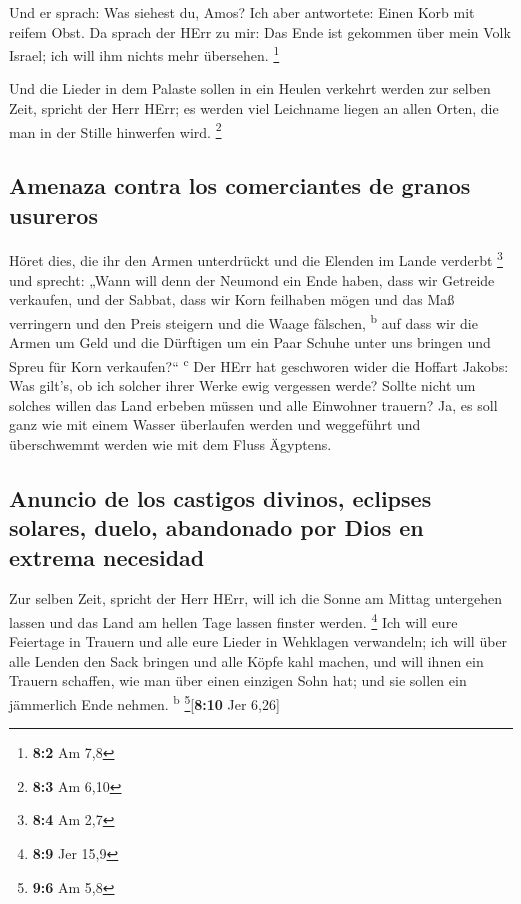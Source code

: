  Und er sprach: Was siehest du, Amos? Ich aber antwortete:
Einen Korb mit reifem Obst. Da sprach der HErr zu mir: Das Ende ist
gekommen über mein Volk Israel; ich will ihm nichts mehr übersehen.
\footnote{\textbf{8:2} Am 7,8}

 Und die Lieder in dem Palaste sollen in ein Heulen
verkehrt werden zur selben Zeit, spricht der Herr HErr; es werden viel
Leichname liegen an allen Orten, die man in der Stille hinwerfen wird.
\footnote{\textbf{8:3} Am 6,10}

\hypertarget{amenaza-contra-los-comerciantes-de-granos-usureros}{%
\subsection{Amenaza contra los comerciantes de granos
usureros}\label{amenaza-contra-los-comerciantes-de-granos-usureros}}

 Höret dies, die ihr den Armen unterdrückt und die Elenden
im Lande verderbt \footnote{\textbf{8:4} Am 2,7}  und
sprecht: „Wann will denn der Neumond ein Ende haben, dass wir Getreide
verkaufen, und der Sabbat, dass wir Korn feilhaben mögen und das Maß
verringern und den Preis steigern und die Waage fälschen,
\textsuperscript{b}  auf dass wir die Armen um Geld und
die Dürftigen um ein Paar Schuhe unter uns bringen und Spreu für Korn
verkaufen?{}`` \textsuperscript{c}  Der HErr hat
geschworen wider die Hoffart Jakobs: Was gilt's, ob ich solcher ihrer
Werke ewig vergessen werde?  Sollte nicht um solches
willen das Land erbeben müssen und alle Einwohner trauern? Ja, es soll
ganz wie mit einem Wasser überlaufen werden und weggeführt und
überschwemmt werden wie mit dem Fluss Ägyptens.

\hypertarget{anuncio-de-los-castigos-divinos-eclipses-solares-duelo-abandonado-por-dios-en-extrema-necesidad}{%
\subsection{Anuncio de los castigos divinos, eclipses solares, duelo,
abandonado por Dios en extrema
necesidad}\label{anuncio-de-los-castigos-divinos-eclipses-solares-duelo-abandonado-por-dios-en-extrema-necesidad}}

 Zur selben Zeit, spricht der Herr HErr, will ich die
Sonne am Mittag untergehen lassen und das Land am hellen Tage lassen
finster werden. \footnote{\textbf{8:9} Jer 15,9}  Ich
will eure Feiertage in Trauern und alle eure Lieder in Wehklagen
verwandeln; ich will über alle Lenden den Sack bringen und alle Köpfe
kahl machen, und will ihnen ein Trauern schaffen, wie man über einen
einzigen Sohn hat; und sie sollen ein jämmerlich Ende nehmen.
\textsuperscript{b} \footnote{\textbf{9:6} Am 5,8}{[}\textbf{8:10} Jer
6,26{]}

